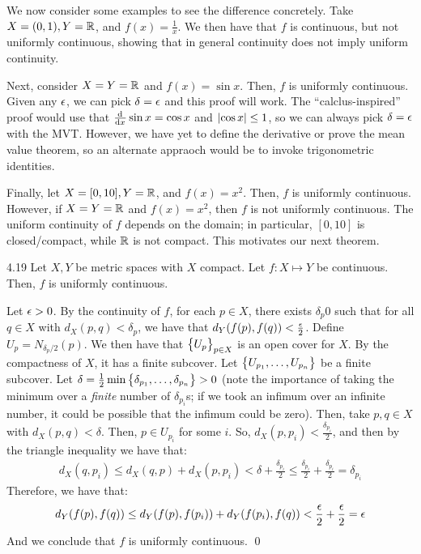 We now consider some examples to see the difference concretely. Take $X = (0, 1), Y = \mathbb{R}$, and $f(x) = \frac{1}{x}$. We then have that $f$ is continuous, but not uniformly continuous, showing that in general continuity does not imply uniform continuity.

Next, consider $X = Y = \mathbb{R}$ and $f(x) = \sin x$. Then, $f$ is uniformly continuous. Given any $\epsilon$, we can pick $\delta = \epsilon$ and this proof will work. The ``calclus-inspired'' proof would use that $\od{}{x}\sin x = \cos x$ and $\abs{\cos x} \leq 1$, so we can always pick $\delta = \epsilon$ with the MVT. However, we have yet to define the derivative or prove the mean value theorem, so an alternate appraoch would be to invoke trigonometric identities.

Finally, let $X = [0, 10], Y = \mathbb{R}$, and $f(x) = x^2$. Then, $f$ is uniformly continuous. However, if $X = Y = \mathbb{R}$ and $f(x) = x^2$, then $f$ is not uniformly continuous. The uniform continuity of $f$ depends on the domain; in particular, $[0, 10]$ is closed/compact, while $\mathbb{R}$ is not compact. This motivates our next theorem.

\begin{theorem}{}{4.19}
    Let $X, Y$ be metric spaces with $X$ compact. Let $f: X \mapsto Y$ be continuous. Then, $f$ is uniformly continuous.
\end{theorem}
\begin{nproof}
    Let $\epsilon > 0$. By the continuity of $f$, for each $p \in X$, there exists $\delta_p  0$ such that for all $q \in X$ with $d_X(p, q)  <\delta_p$, we have that $d_Y(f(p), f(q)) < \frac{\epsilon}{2}$. Define $U_p = N_{\delta_p/2}(p)$. We then have that $\set{U_p}_{p \in X}$ is an open cover for $X$. By the compactness of $X$, it has a finite subcover. Let $\set{U_{p_1}, \ldots, U_{p_n}}$ be a finite subcover. Let $\delta = \frac{1}{2}\min\set{\delta_{p_1}, \ldots, \delta_{p_n}} > 0$ (note the importance of taking the minimum over a \textit{finite} number of $\delta_{p_i}$s; if we took an infimum over an infinite number, it could be possible that the infimum could be zero). Then, take $p, q \in X$ with $d_X(p, q) < \delta$. Then, $p \in U_{p_i}$ for some $i$. So, $d_X(p, p_i) < \frac{\delta_{p_i}}{2}$, and then by the triangle inequality we have that:
    \begin{align*}
        d_X(q, p_i) \leq d_X(q, p) + d_X(p, p_i) < \delta + \frac{\delta_{p_i}}{2} \leq \frac{\delta_{p_i}}{2} + \frac{\delta_{p_i}}{2} = \delta_{p_i}
    \end{align*} 
    Therefore, we have that:
    \begin{align*}
        d_Y(f(p), f(q)) \leq d_Y(f(p), f(p_i)) + d_Y(f(p_i), f(q)) < \frac{\epsilon}{2} + \frac{\epsilon}{2} = \epsilon
    \end{align*}
    And we conclude that $f$ is uniformly continuous. \qed
\end{nproof}

